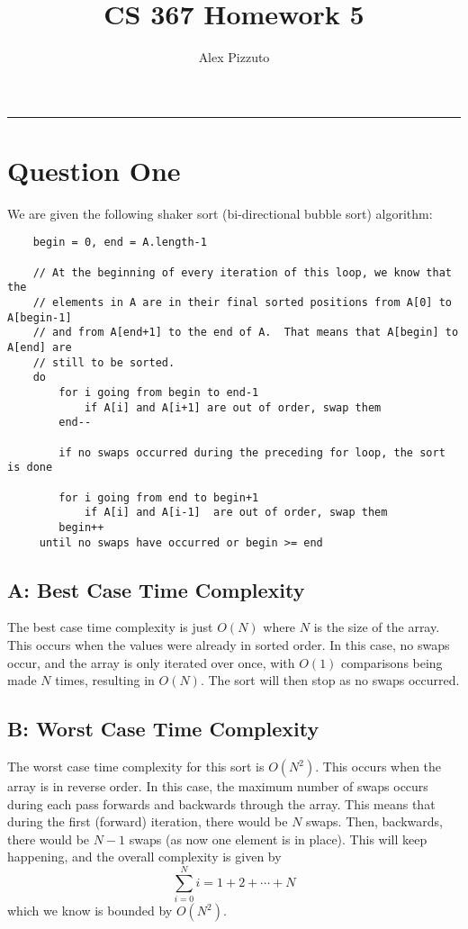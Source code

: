\documentclass[11pt,letterpaper]{article}
\author{Alex Pizzuto}
\title{CS 367 Homework 5}
\begin{document}
\date{}
\maketitle
\hrule

\section{Question One}
We are given the following shaker sort (bi-directional bubble sort) algorithm:
\begin{lstlisting}
	begin = 0, end = A.length-1

	// At the beginning of every iteration of this loop, we know that the 
	// elements in A are in their final sorted positions from A[0] to A[begin-1]
	// and from A[end+1] to the end of A.  That means that A[begin] to A[end] are
	// still to be sorted.
	do
	    for i going from begin to end-1
	        if A[i] and A[i+1] are out of order, swap them
	    end--

	    if no swaps occurred during the preceding for loop, the sort is done

	    for i going from end to begin+1
	        if A[i] and A[i-1]  are out of order, swap them
	    begin++
	 until no swaps have occurred or begin >= end
\end{lstlisting}
\subsection{A: Best Case Time Complexity}
The best case time complexity is just $O(N)$ where $N$ is the size of the array. This occurs when the values were already in sorted order. In this case, no swaps occur, and the array is only iterated over once, with $O(1)$ comparisons being made $N$ times, resulting in $O(N)$. The sort will then stop as no swaps occurred. 
\subsection{B: Worst Case Time Complexity}
The worst case time complexity for this sort is $O(N^2)$. This occurs when the array is in reverse order. In this case, the maximum number of swaps occurs during each pass forwards and backwards through the array. This means that during the first (forward) iteration, there would be $N$ swaps. Then, backwards, there would be $N-1$ swaps (as now one element is in place). This will keep happening, and the overall complexity is given by 
\begin{equation*}
	\sum_{i=0}^{N}i = 1 + 2 + \cdots + N
\end{equation*}
which we know is bounded by $O(N^2)$.
\end{document}
